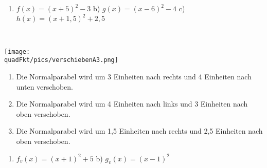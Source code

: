 \begin{Answer}[ref=verschiebenA2]
	\begin{enumerate}[label=\alph*)]
		\item \(f(x)=\left(x+5\right)^2-3\) \quad b) \(g(x)=\left(x-6\right)^2-4\) \quad c) \(h(x)=\left(x+1,5\right)^2+2,5\)
	\end{enumerate}
\end{Answer}


\begin{Answer}[ref=verschiebenA3]\\
	\begin{minipage}{\linewidth}\centering
		\texttt{[image: \\quadFkt/pics/verschiebenA3.png]}
	\end{minipage}\vspace{.1cm}
	\begin{enumerate}[label=\alph*)]
		\item Die Normalparabel wird um 3 Einheiten nach rechts und 4 Einheiten nach unten verschoben.
		\item Die Normalparabel wird um 4 Einheiten nach links und 3 Einheiten nach oben verschoben.
		\item Die Normalparabel wird um 1,5 Einheiten nach rechts und 2,5 Einheiten nach oben verschoben.
	\end{enumerate}
\end{Answer}
\begin{Answer}[ref=verschiebenA4]
	\begin{enumerate}[label=\alph*)]
		\item \(f_v(x)=(x+1)^2+5\) \quad b) \(g_v(x)=(x-1)^2\)
	\end{enumerate}
\end{Answer}\newpage
